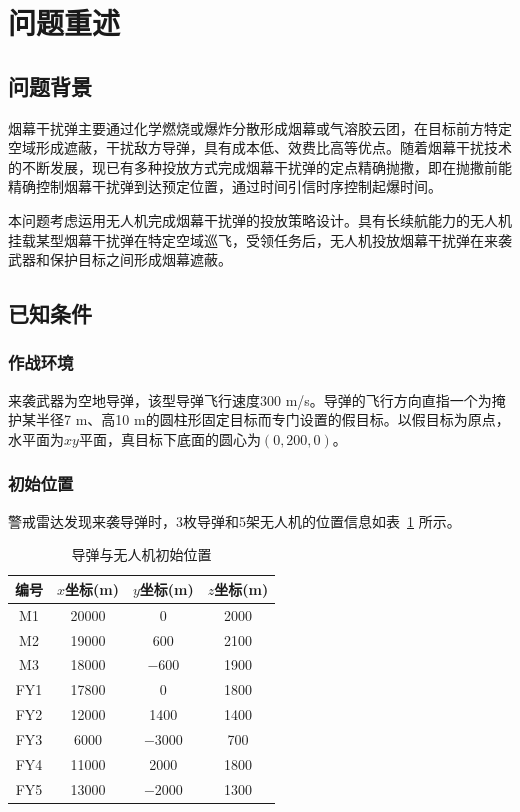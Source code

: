 \documentclass[12pt,a4paper]{article}
\begin{document}
\setcounter{page}{1}

\section{问题重述}

\subsection{问题背景}

烟幕干扰弹主要通过化学燃烧或爆炸分散形成烟幕或气溶胶云团，在目标前方特定空域形成遮蔽，干扰敌方导弹，具有成本低、效费比高等优点。随着烟幕干扰技术的不断发展，现已有多种投放方式完成烟幕干扰弹的定点精确抛撒，即在抛撒前能精确控制烟幕干扰弹到达预定位置，通过时间引信时序控制起爆时间。

本问题考虑运用无人机完成烟幕干扰弹的投放策略设计。具有长续航能力的无人机挂载某型烟幕干扰弹在特定空域巡飞，受领任务后，无人机投放烟幕干扰弹在来袭武器和保护目标之间形成烟幕遮蔽。

\subsection{已知条件}

\subsubsection{作战环境}

来袭武器为空地导弹，该型导弹飞行速度300 m/s。导弹的飞行方向直指一个为掩护某半径7 m、高10 m的圆柱形固定目标而专门设置的假目标。以假目标为原点，水平面为$xy$平面，真目标下底面的圆心为$(0, 200, 0)$。

\subsubsection{初始位置}

警戒雷达发现来袭导弹时，3枚导弹和5架无人机的位置信息如表~\ref{tab:init_pos} 所示。

\begin{table}[H]
    \centering
    \caption{导弹与无人机初始位置}
    \label{tab:init_pos}
    \begin{tabular}{cccc}
        \toprule
        编号 & $x$坐标(m) & $y$坐标(m) & $z$坐标(m) \\
        \midrule
        M1 & 20000 & 0 & 2000 \\
        M2 & 19000 & 600 & 2100 \\
        M3 & 18000 & $-600$ & 1900 \\
        \midrule
        FY1 & 17800 & 0 & 1800 \\
        FY2 & 12000 & 1400 & 1400 \\
        FY3 & 6000 & $-3000$ & 700 \\
        FY4 & 11000 & 2000 & 1800 \\
        FY5 & 13000 & $-2000$ & 1300 \\
        \bottomrule
    \end{tabular}
\end{table}
\end{document}
